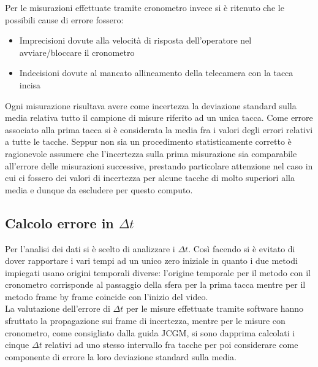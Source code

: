 \documentclass[a4paper,11pt,oneside]{article}
\begin{document}
Per le misurazioni effettuate tramite cronometro invece si è ritenuto che le possibili cause di errore fossero:
\begin{itemize}
    \item Imprecisioni dovute alla velocità di risposta dell'operatore nel avviare/bloccare il cronometro
    \item Indecisioni dovute al mancato allineamento della telecamera con la tacca incisa
\end{itemize}
Ogni misurazione risultava avere come incertezza la deviazione standard sulla media relativa tutto il campione di misure riferito ad un unica tacca. Come errore associato alla prima tacca si è considerata la media fra i valori degli errori relativi a tutte le tacche.
Seppur non sia un procedimento statisticamente corretto è ragionevole assumere che l'incertezza sulla prima misurazione sia comparabile all'errore delle misurazioni successive, prestando particolare attenzione nel caso in cui ci fossero dei valori di incertezza per alcune tacche di molto superiori alla media e dunque da escludere per questo computo.


\subsection{Calcolo errore in $\Delta t$}
Per l'analisi dei dati si è scelto di analizzare i $\Delta t$. Così facendo si è evitato di dover rapportare i vari tempi ad un unico zero iniziale in quanto i due metodi impiegati usano origini temporali diverse: l'origine temporale per il metodo con il cronometro corrisponde al passaggio della sfera per la prima tacca mentre per il metodo frame by frame coincide con l'inizio del video.\\
La valutazione dell'errore di $\Delta t$ per le misure effettuate tramite software hanno sfruttato la propagazione sui frame di incertezza, mentre per le misure con cronometro, come consigliato dalla guida JCGM, si sono dapprima calcolati i cinque $\Delta t$ relativi ad uno stesso intervallo fra tacche per poi considerare come componente di errore la loro deviazione standard sulla media.

\end{document}
